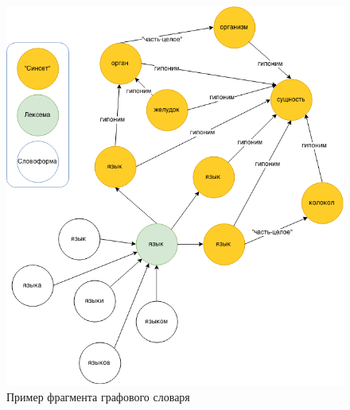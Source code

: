 \begin{figure}[H]
	\centering
	\includegraphics[scale=0.5]{img/dict.png}
	\caption{Пример фрагмента графового словаря}
\end{figure}

